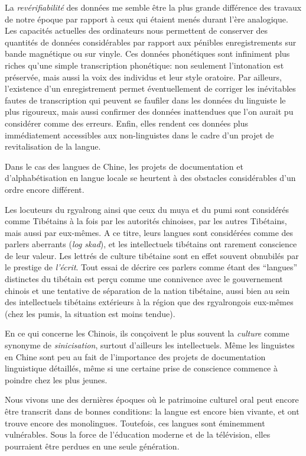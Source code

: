 \documentclass[oldfontcommands,oneside,a4paper,11pt]{memoir}
\begin{document}
La \textit{revérifiabilité} des données me semble être la plus grande différence des travaux de notre époque par rapport à ceux qui étaient menés durant l'ère analogique. Les capacités actuelles des ordinateurs nous permettent de conserver des quantités de données considérables par rapport aux pénibles enregistrements sur bande magnétique ou sur vinyle. Ces données phonétiques sont infiniment plus riches qu'une simple transcription phonétique: non seulement l'intonation est préservée, mais aussi la voix des individus et leur style oratoire. Par ailleurs, l'existence d'un enregistrement permet éventuellement de corriger les inévitables fautes de transcription qui peuvent se faufiler dans les données  du linguiste le plus rigoureux, mais aussi confirmer des données inattendues que l'on aurait pu considérer comme des erreurs. Enfin, elles rendent ces données plus immédiatement accessibles aux non-linguistes dans le cadre d'un projet de revitalisation de la langue.




Dans le cas des langues de Chine, les projets de documentation et d'alphabétisation en langue locale se heurtent à des obstacles considérables d'un ordre encore différent.

Les locuteurs du rgyalrong ainsi que ceux du muya et du pumi sont considérés comme Tibétains à la fois par les autorités chinoises, par les autres Tibétains, mais aussi par eux-mêmes. A ce titre, leurs langues sont considérées comme des parlers aberrants (\textit{log skad}), et les intellectuels tibétains ont rarement conscience de leur valeur. Les lettrés de culture tibétaine sont en effet souvent obnubilés par le prestige de \textit{l'écrit}. Tout essai de décrire ces parlers comme étant des ``langues'' distinctes du tibétain est perçu comme une connivence avec le gouvernement chinois et une tentative de séparation de la nation tibétaine, aussi bien au sein des intellectuels tibétains extérieurs à la région que des rgyalrongois eux-mêmes (chez les pumis, la situation est moins tendue).

En ce qui concerne les Chinois,  ils conçoivent le plus souvent la \textit{culture} comme synonyme de \textit{sinicisation}, surtout d'ailleurs les intellectuels. Même les linguistes en Chine sont peu au fait de l'importance des projets de documentation linguistique détaillés, même si une certaine prise de conscience commence à poindre chez les plus jeunes.

Nous vivons une des dernières époques où le patrimoine culturel oral peut encore être transcrit dans de bonnes conditions: la langue est encore bien vivante, et ont trouve encore des monolingues. Toutefois, ces langues sont éminemment vulnérables. Sous la force de l'éducation moderne et de la télévision, elles pourraient être perdues en une seule génération. 
\end{document}

